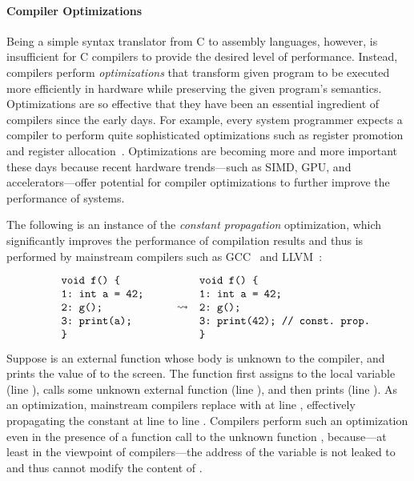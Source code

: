 \paragraph{Compiler Optimizations}

Being a simple syntax translator from C to assembly languages, however, is insufficient for C
compilers to provide the desired level of performance.  Instead, compilers perform
\emph{optimizations} that transform given program to be executed more efficiently in hardware while
preserving the given program's semantics.  Optimizations are so effective that they have been an
essential ingredient of compilers since the early days.  For example, every system programmer
expects a compiler to perform quite sophisticated optimizations such as register
promotion~\cite{mem2reg} and register allocation~\cite{regalloc}.  Optimizations are becoming more
and more important these days because recent hardware trends---such as SIMD, GPU, and
accelerators---offer potential for compiler optimizations to further improve the performance of
systems.

The following is an instance of the \emph{constant propagation} optimization, which significantly
improves the performance of compilation results and thus is performed by mainstream compilers such
as GCC~\cite{gcc} and LLVM~\cite{llvm}:

%
\[\begin{array}{rcl}
\begin{minipage}{0.27\textwidth}
\begin{verbatim}
void f() {
1: int a = 42;
2: g();
3: print(a);
}
\end{verbatim}
\end{minipage}
&
\optarrow
&
\begin{minipage}{0.4\textwidth}
\begin{verbatim}
void f() {
1: int a = 42;
2: g();
3: print(42); // const. prop.
}
\end{verbatim}
\end{minipage}
\end{array}\]

\noindent Suppose  is an external function whose body is unknown to the compiler, and
 prints the value of  to the screen.  The function  first assigns
 to the local variable  (line ), calls some unknown external function
 (line ), and then prints  (line ).  As an optimization,
mainstream compilers replace  with  at line , effectively propagating the
constant  at line  to line .  Compilers perform such an optimization even
in the presence of a function call to the unknown function , because---at least in the
viewpoint of compilers---the address of the variable  is not leaked to  and thus
 cannot modify the content of .

